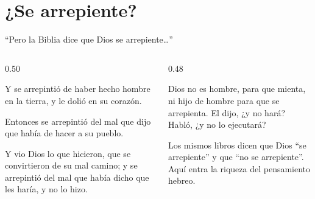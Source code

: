 \section{¿Se arrepiente?}

\begin{frame}{``Pero la Biblia dice que Dios se arrepiente\ldots''}
\begin{columns}[t,onlytextwidth]
\begin{column}{0.50\textwidth}
\begin{cita}Y se arrepintió \SENOR{} de haber hecho hombre en la tierra, y le dolió en su corazón.\end{cita}
\begin{cita}Entonces \SENOR{} se arrepintió del mal que dijo que había de hacer a su pueblo.\end{cita}
\begin{cita}Y vio Dios lo que hicieron, que se convirtieron de su mal camino; y se arrepintió del mal que había dicho que les haría, y no lo hizo.\end{cita}
\end{column}
\begin{column}{0.48\textwidth}
\begin{cita}Dios no es hombre, para que mienta, ni hijo de hombre para que se arrepienta. El dijo, ¿y no hará? Habló, ¿y no lo ejecutará?\end{cita}
\small Los mismos libros dicen que Dios ``se arrepiente'' y que ``no se arrepiente''. Aquí entra la riqueza del pensamiento hebreo.
\end{column}
\end{columns}
\end{frame}

